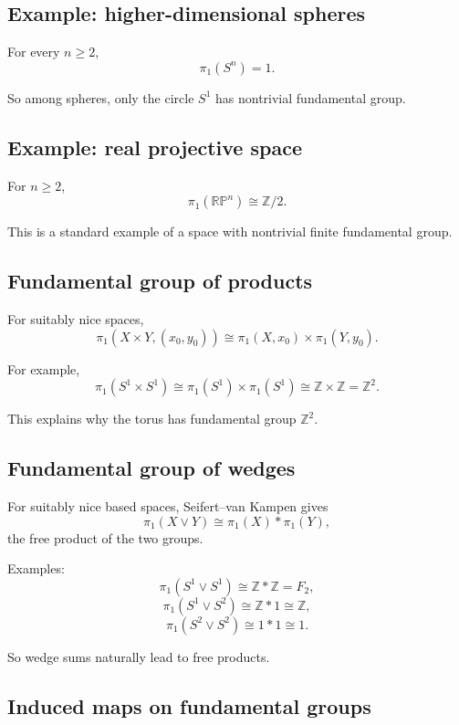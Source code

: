 \documentclass[12pt,a4paper]{article}
\theoremstyle{notespace}
\begin{document}
\bigskip

\subsection{ Example: higher-dimensional spheres}

For every \(n\ge 2\),
\[
\pi_1(S^n)=1.
\]

So among spheres, only the circle \(S^1\) has nontrivial fundamental group.

\bigskip

\subsection{ Example: real projective space}

For \(n\ge 2\),
\[
\pi_1(\mathbb{RP}^n)\cong \mathbb Z/2.
\]

This is a standard example of a space with nontrivial finite fundamental group.

\bigskip

\subsection{ Fundamental group of products}

For suitably nice spaces,
\[
\pi_1(X\times Y,(x_0,y_0))\cong \pi_1(X,x_0)\times \pi_1(Y,y_0).
\]

For example,
\[
\pi_1(S^1\times S^1)\cong \pi_1(S^1)\times \pi_1(S^1)\cong \mathbb Z\times\mathbb Z=\mathbb Z^2.
\]

This explains why the torus has fundamental group \(\mathbb Z^2\).

\bigskip

\subsection{ Fundamental group of wedges}

For suitably nice based spaces, Seifert--van Kampen gives
\[
\pi_1(X\vee Y)\cong \pi_1(X)*\pi_1(Y),
\]
the free product of the two groups.

Examples:
\[
\pi_1(S^1\vee S^1)\cong \mathbb Z*\mathbb Z=F_2,
\]
\[
\pi_1(S^1\vee S^2)\cong \mathbb Z*1\cong \mathbb Z,
\]
\[
\pi_1(S^2\vee S^2)\cong 1*1\cong 1.
\]

So wedge sums naturally lead to free products.

\bigskip

\subsection{ Induced maps on fundamental groups}
\end{document}
